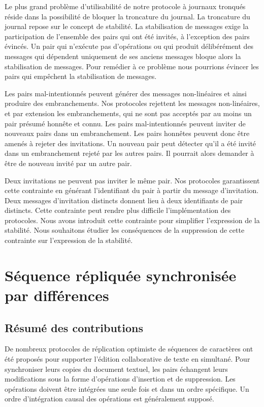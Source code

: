 Le plus grand problème d'utilisabilité de notre protocole à journaux tronqués réside dans la possibilité de bloquer la troncature du journal.
La troncature du journal repose sur le concept de stabilité.
La stabilisation de messages exige la participation de l'ensemble des pairs qui ont été invités, à l'exception des pairs évincés.
Un pair qui n'exécute pas d'opérations ou qui produit délibérément des messages qui dépendent uniquement de ses anciens messages bloque alors la stabilisation de messages.
Pour remédier à ce problème nous pourrions évincer les pairs qui empêchent la stabilisation de messages.

Les pairs mal-intentionnés peuvent générer des messages non-linéaires et ainsi produire des embranchements.
Nos protocoles rejettent les messages non-linéaires, et par extension les embranchements, qui ne sont pas acceptés par au moins un pair présumé honnête et connu.
Les pairs mal-intentionnés peuvent inviter de nouveaux pairs dans un embranchement.
Les pairs honnêtes peuvent donc être amenés à rejeter des invitations.
Un nouveau pair peut détecter qu'il a été invité dans un embranchement rejeté par les autres pairs.
Il pourrait alors demander à être de nouveau invité par un autre pair.

Deux invitations ne peuvent pas inviter le même pair.
Nos protocoles garantissent cette contrainte en générant l'identifiant du pair à partir du message d'invitation.
Deux messages d'invitation distincts donnent lieu à deux identifiants de pair distincts.
Cette contrainte peut rendre plus difficile l'implémentation des protocoles.
Nous avons introduit cette contrainte pour simplifier l'expression de la stabilité.
Nous souhaitons étudier les conséquences de la suppression de cette contrainte sur l'expression de la stabilité.


\section{Séquence répliquée synchronisée par différences}

\subsection{Résumé des contributions}

De nombreux protocoles de réplication optimiste de séquences de caractères ont été proposés pour supporter l'édition collaborative de texte en simultané.
Pour synchroniser leurs copies du document textuel, les pairs échangent leurs modifications sous la forme d'opérations d'insertion et de suppression.
Les opérations doivent être intégrées une seule fois et dans un ordre spécifique.
Un ordre d'intégration causal des opérations est généralement supposé.

